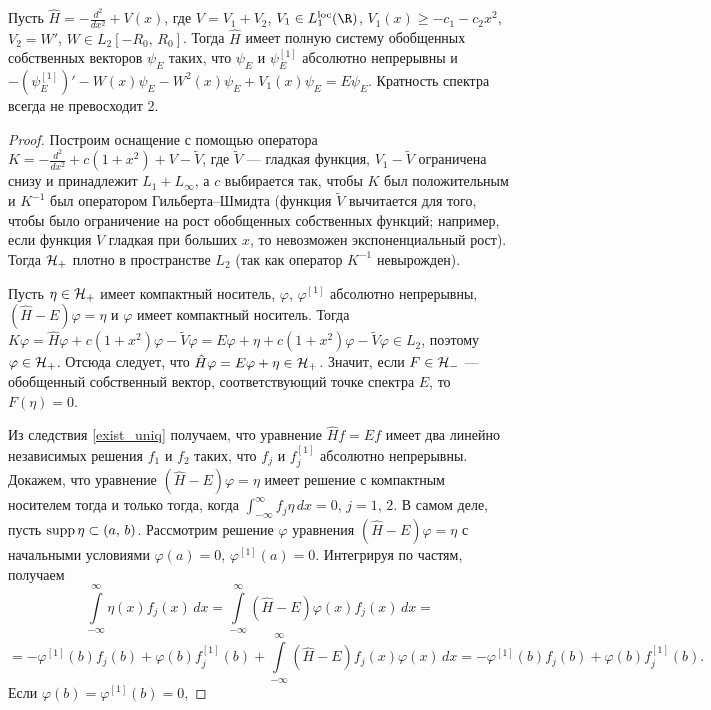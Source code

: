 \documentclass[a4paper
]{article}
\begin{document}
\begin{Sta}
\label{regularnost_sobstv_func}
Пусть $\hat H=-\frac{d^2}{dx^2}+V(x)$, где $V=V_1+V_2$, $V_1\in L_1^{{\rm
loc}}(\R)$, $V_1(x)\ge -c_1-c_2x^2$, $V_2=W'$, $W\in L_2[-R_0, \, R_0]$.
Тогда $\hat H$ имеет полную систему обобщенных собственных векторов
$\psi_E$ таких, что $\psi_E$ и $\psi_E^{[1]}$ абсолютно непрерывны и
$-(\psi_E^{[1]})'-W(x)\psi_E-W^2(x)\psi_E+V_1(x)\psi_E=E\psi_E$. Кратность
спектра всегда не превосходит 2.
\end{Sta}
\begin{proof}
Построим оснащение с помощью оператора $K=-\frac{d^2}{dx^2}+c(1+x^2)+V-
\tilde V$, где $\tilde V$ --- гладкая функция, $V_1-\tilde V$ ограничена
снизу и принадлежит $L_1+L_\infty$, а $c$ выбирается так, чтобы $K$ был
положительным и $K^{-1}$ был оператором Гильберта--Шмидта (функция
$\tilde V$ вычитается для того, чтобы было ограничение на рост
обобщенных собственных функций; например, если функция $V$ гладкая
при больших $x$, то невозможен экспоненциальный рост). Тогда ${\cal H}_+$
плотно в пространстве $L_2$ (так как оператор $K^{-1}$ невырожден).\par
Пусть $\eta \in {\cal H}_+$
имеет компактный носитель, $\varphi$, $\varphi^{[1]}$ абсолютно
непрерывны, $(\hat H-E)\varphi=\eta$ и $\varphi$ имеет компактный носитель.
Тогда $K\varphi=\hat H\varphi+c(1+x^2)\varphi-\tilde V\varphi =
E\varphi+\eta+c(1+x^2)\varphi -\tilde V\varphi\in L_2$, поэтому
$\varphi\in {\cal H}_+$. Отсюда следует, что $\hat H
\varphi=E\varphi+\eta\in {\cal H}_+$. Значит, если $F\in {\cal H}_-$
--- обобщенный собственный вектор, соответствующий точке спектра $E$,
то $F(\eta)=0$. \par
Из следствия \ref{exist_uniq} получаем, что уравнение $\hat Hf = Ef$
имеет два линейно независимых решения $f_1$ и $f_2$ таких, что $f_j$
и $f_j^{[1]}$ абсолютно непрерывны. Докажем, что уравнение $(\hat H-E)
\varphi=\eta$ имеет решение с компактным носителем тогда и только тогда,
когда $\int _{-\infty}^\infty f_j\eta\, dx=0$, $j=1$, $2$. В самом
деле, пусть ${\rm supp}\, \eta\subset (a, \, b)$. Рассмотрим решение
$\varphi$ уравнения $(\hat H-E)\varphi=\eta$ с начальными условиями
$\varphi(a)=0$, $\varphi^{[1]}(a)=0$. Интегрируя по частям, получаем
$$\int \limits_{-\infty}^\infty \eta(x) f_j(x)\, dx=\int \limits_{-\infty}
^\infty (\hat H-E)\varphi(x) f_j(x)\, dx=$$
$$=-\varphi^{[1]}(b)f_j(b)+\varphi(b)f_j^{[1]}(b)+\int \limits_{-\infty}
^\infty (\hat H-E)f_j(x) \varphi(x)\, dx=-\varphi^{[1]}(b)f_j(b)
+\varphi(b)f_j^{[1]}(b).$$ Если $\varphi(b)=\varphi^{[1]}(b)=0$,

\end{proof}
\end{document}
